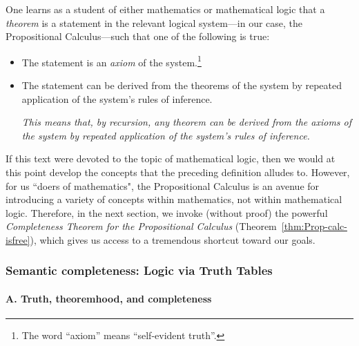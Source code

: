 One learns as a student of either mathematics or mathematical logic that a {\it theorem} is a statement in the relevant logical system---in our case, the Propositional Calculus---such that one of the following is true:
\begin{itemize}
\item
The statement is an {\it axiom} of the system.\footnote{The word ``axiom'' means ``self-evident truth''.}
\medskip\item
The statement can be derived from the theorems of the system by repeated application of the system's rules of inference.

\smallskip


{\em This means that, by recursion, any theorem can be derived from the axioms of the system by repeated application of the system's rules of inference.}
\end{itemize}
If this text were devoted to the topic of mathematical logic, then we would at this point develop the concepts that the preceding definition alludes to.  However, for us ``doers of mathematics", the Propositional Calculus is an avenue for introducing a variety of concepts within mathematics, not within mathematical logic.  Therefore, in the next section, we invoke (without proof) the powerful {\it Completeness Theorem for the Propositional Calculus} 
(Theorem~\ref{thm:Prop-calc-isfree}), which gives us access to a tremendous shortcut toward our goals.

\subsubsection{Semantic completeness: Logic via Truth Tables}
\label{sec:truth-tables}

\paragraph {A. Truth, theoremhood, and completeness}

